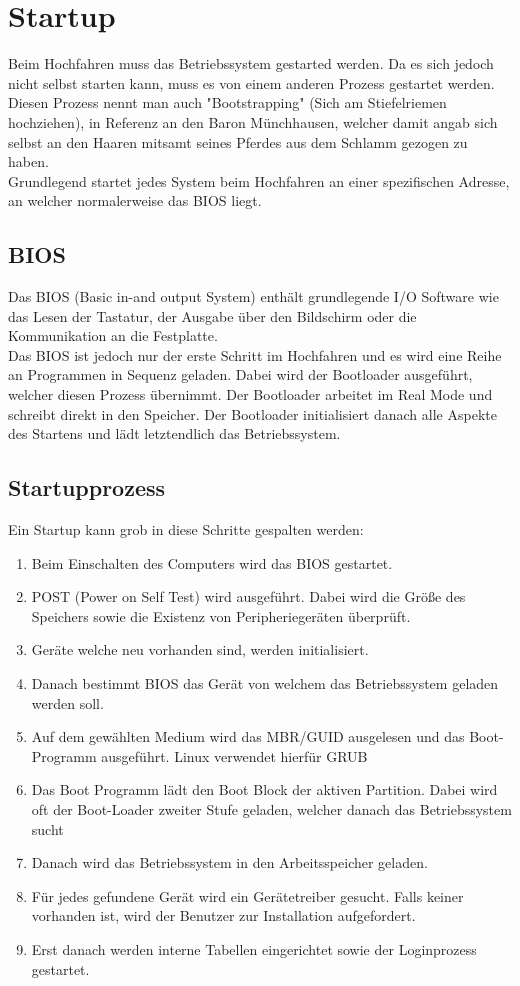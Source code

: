 \documentclass{article}
\begin{document}
	\section{Startup}
	Beim Hochfahren muss das Betriebssystem gestarted werden. Da es sich jedoch nicht selbst starten kann, muss es von einem anderen Prozess gestartet werden. Diesen Prozess nennt man auch "Bootstrapping" (Sich am Stiefelriemen hochziehen), in Referenz an den Baron Münchhausen, welcher damit angab sich selbst an den Haaren mitsamt seines Pferdes aus dem Schlamm gezogen zu haben. \\
	Grundlegend startet jedes System beim Hochfahren an einer spezifischen Adresse, an welcher normalerweise das BIOS liegt.
	\subsection{BIOS}
	Das BIOS (Basic in-and output System) enthält grundlegende I/O Software wie das Lesen der Tastatur, der Ausgabe über den Bildschirm oder die Kommunikation an die Festplatte. \\
	Das BIOS ist jedoch nur der erste Schritt im Hochfahren und es wird eine Reihe an Programmen in Sequenz geladen. Dabei wird der Bootloader ausgeführt, welcher diesen Prozess übernimmt. Der Bootloader arbeitet im Real Mode und schreibt direkt in den Speicher. Der Bootloader initialisiert danach alle Aspekte des Startens und lädt letztendlich das Betriebssystem. \\
	\subsection{Startupprozess}
	Ein Startup kann grob in diese Schritte gespalten werden:
	\begin{enumerate}
		\item{Beim Einschalten des Computers wird das BIOS gestartet.}
		\item{POST (Power on Self Test) wird ausgeführt. Dabei wird die Größe des Speichers sowie die Existenz von Peripheriegeräten überprüft.}
		\item{Geräte welche neu vorhanden sind, werden initialisiert.}
		\item{Danach bestimmt BIOS das Gerät von welchem das Betriebssystem geladen werden soll.}
		\item{Auf dem gewählten Medium wird das MBR/GUID ausgelesen und das Boot-Programm ausgeführt. Linux verwendet hierfür GRUB}
		\item{Das Boot Programm lädt den Boot Block der aktiven Partition. Dabei wird oft der Boot-Loader zweiter Stufe geladen, welcher danach das Betriebssystem sucht}
		\item{Danach wird das Betriebssystem in den Arbeitsspeicher geladen.}
		\item{Für jedes gefundene Gerät wird ein Gerätetreiber gesucht. Falls keiner vorhanden ist, wird der Benutzer zur Installation aufgefordert.}
		\item{Erst danach werden interne Tabellen eingerichtet sowie der Loginprozess gestartet.}
	\end{enumerate}
	
\end{document}

